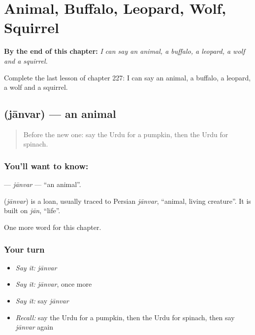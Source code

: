 
\chapter{Animal, Buffalo, Leopard, Wolf, Squirrel}
\label{ch:ur-animal-buffalo-leopard-wolf-squirrel}

\begin{chapteropening}
\textbf{By the end of this chapter:} \emph{I can say an animal, a buffalo, a leopard, a wolf and a squirrel.}

Complete the last lesson of chapter 227: I can say an animal, a buffalo, a leopard, a wolf and a squirrel.
\end{chapteropening}

\section[\texorpdfstring{\ur{جانور} (jānvar)}{جانور (jānvar)}]{ (jānvar) — an animal}

\label{lesson:UR-C227-janvar}



\begin{quote}
Before the new one: say the Urdu for a pumpkin, then the Urdu for spinach.
\end{quote}

\subsection*{You'll want to know: }
\textbf{} — \emph{jānvar} — \textquotedblleft{}an animal\textquotedblright{}.

\begin{cousinweb}
\textbf{} (\emph{jānvar}) is a loan, usually traced to Persian \emph{jānvar}, \textquotedblleft{}animal, living creature\textquotedblright{}. It is built on \emph{jān}, \textquotedblleft{}life\textquotedblright{}.
\end{cousinweb}

\begin{grammarlens}[title={What you've built}]
One more word for this chapter.
\end{grammarlens}

\subsection*{Your turn}
\begin{itemize}
\raggedright
  \item \emph{Say it:} \emph{jānvar}
  \item \emph{Say it:} \emph{jānvar}, once more
  \item \emph{Say it:} say \emph{jānvar}
  \item \emph{Recall:} say the Urdu for a pumpkin, then the Urdu for spinach, then say \emph{jānvar} again
\end{itemize}


